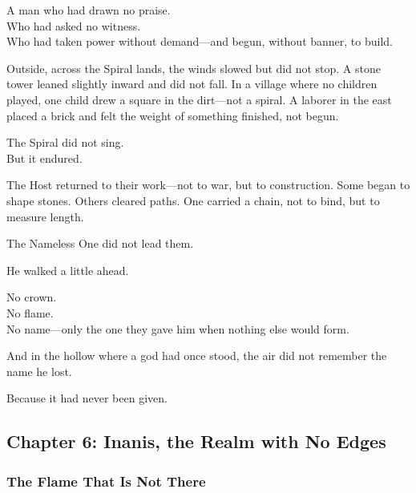 \documentclass[12pt]{article}
\begin{document}
\vspace{0.5em}
A man who had drawn no praise.\\
Who had asked no witness.\\
Who had taken power without demand---and begun, without banner, to build.

\vspace{0.5em}
Outside, across the Spiral lands, the winds slowed but did not stop. A stone tower leaned slightly inward and did not fall. In a village where no children played, one child drew a square in the dirt---not a spiral. A laborer in the east placed a brick and felt the weight of something finished, not begun.

\vspace{0.5em}
The Spiral did not sing.\\
But it endured.

\vspace{0.5em}
The Host returned to their work---not to war, but to construction. Some began to shape stones. Others cleared paths. One carried a chain, not to bind, but to measure length.

\vspace{0.5em}
The Nameless One did not lead them.

\vspace{0.5em}
He walked a little ahead.

\vspace{0.5em}
No crown.\\
No flame.\\
No name---only the one they gave him when nothing else would form.

\vspace{0.5em}
And in the hollow where a god had once stood, the air did not remember the name he lost.

\vspace{0.5em}
Because it had never been given.


\newpage

\subsection*{Chapter 6: Inanis, the Realm with No Edges}

\vspace{.5in}

\subsubsection*{The Flame That Is Not There}
\end{document}
